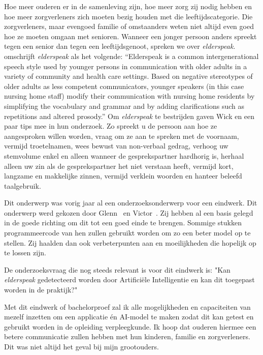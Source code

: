 Hoe meer ouderen er in de samenleving zijn, hoe meer zorg zij nodig hebben en hoe meer zorgverleners zich moeten bezig houden met die leeftijdscategorie.
Die zorgverleners, maar evengoed familie of omstaanders weten niet altijd even goed hoe ze moeten omgaan met senioren.
Wanneer een jonger persoon anders spreekt tegen een senior dan tegen een leeftijdsgenoot, spreken we over \textit{elderspeak}. \textcite{Williams2011} omschrijft \textit{elderspeak} als het volgende: \enquote{Elderspeak is a common intergenerational speech style used by younger persons in communication with older adults in a variety of community and health care settings. Based on negative stereotypes of older adults as less competent communicators, younger speakers (in this case nursing home staff) modify their communication with nursing home residents by simplifying the vocabulary and grammar and by adding clarifications such as repetitions and altered prosody.} Om \textit{elderspeak} te bestrijden gaven Wick en \textcite{Wick2007} een paar tips mee in hun onderzoek.
Zo spreekt u de persoon aan hoe ze aangesproken willen worden, vraag om ze aan te spreken met de voornaam, vermijd troetelnamen, wees bewust van non-verbaal gedrag, verhoog uw stemvolume enkel en alleen wanneer de gesprekspartner hardhorig is, herhaal alleen uw zin als de gesprekspartner het niet verstaan heeft, vermijd kort, langzame en makkelijke zinnen, vermijd verklein woorden en hanteer beleefd taalgebruik.

Dit onderwerp was vorig jaar al een onderzoeksonderwerp voor een eindwerk.
Dit onderwerp werd gekozen door Glenn~\textcite{Beeckman2021} en Victor~\textcite{Standaert2021}.
Zij hebben al een basis gelegd in de goede richting om dit tot een goed einde te brengen.
Sommige stukken programmeercode van hen zullen gebruikt worden om zo een beter model op te stellen.
Zij haalden dan ook verbeterpunten aan en moeilijkheden die hopelijk op te lossen zijn.

De onderzoeksvraag die nog steeds relevant is voor dit eindwerk is: "Kan \textit{elderspeak} gedetecteerd worden door Artificiële Intelligentie en kan dit toegepast worden in de praktijk?"

Met dit eindwerk of bachelorproef zal ik alle mogelijkheden en capaciteiten van mezelf inzetten om een applicatie én AI-model te maken zodat dit kan getest en gebruikt worden in de opleiding verpleegkunde.
Ik hoop dat ouderen hiermee een betere communicatie zullen hebben met hun kinderen, familie en zorgverleners.
Dit was niet altijd het geval bij mijn grootouders.

